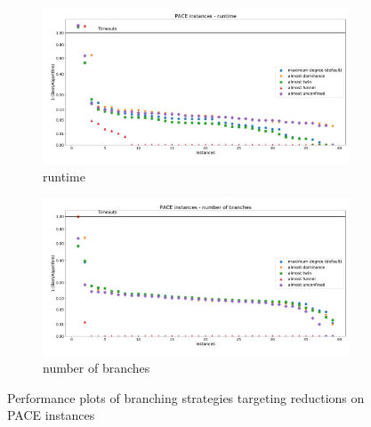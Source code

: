 \documentclass[12pt,a4paper,twoside]{scrartcl}
\numberwithin{equation}{section}
\begin{document}
\begin{figure}[hbt!]
	\begin{subfigure}{1\textwidth}
		\includegraphics[width=\textwidth]{images/plots/a2_pace_t}
		\caption{runtime}
	\end{subfigure}
	\begin{subfigure}{1\textwidth}
		\includegraphics[width=\textwidth]{images/plots/a2_pace_b}
		\caption{number of branches}
	\end{subfigure}
	\caption{Performance plots of branching strategies targeting reductions on PACE instances}
	\label{111}
\end{figure}
\end{document}
